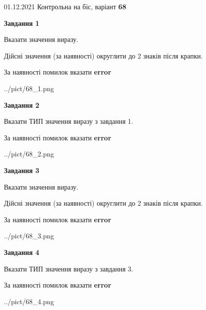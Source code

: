 \documentclass[11pt, ukrainian]{article}
\begin{document}
{01.12.2021 Контрольна на біс, варіант  \No \textbf { 68 }\par}
{
\begin {large}
{\begin {center}\textbf{Завдання 1}\end {center}}\par
Вказати значення виразу. \par
Дійсні значення (за наявності) округлити до 2 знаків після крапки. \par
За наявності помилок вказати \textbf{error}

\begin{center}
	{../pict/68_1.png}
\end{center}
\newpage

{\begin {center}\textbf{Завдання 2}\end {center}}\par
Вказати ТИП значення виразу з завдання 1. \par
За наявності помилок вказати \textbf{error}

\begin{center}
	{../pict/68_2.png}
\end{center}
\newpage

{\begin {center}\textbf{Завдання 3}\end {center}}\par
Вказати значення виразу. \par
Дійсні значення (за наявності) округлити до 2 знаків після крапки. \par
За наявності помилок вказати \textbf{error}

\begin{center}
	{../pict/68_3.png}
\end{center}
\newpage

{\begin {center}\textbf{Завдання 4}\end {center}}\par
Вказати ТИП значення виразу з завдання 3. \par
За наявності помилок вказати \textbf{error}

\begin{center}
	{../pict/68_4.png}
\end{center}
\newpage


\end{large}}
\end{document}

